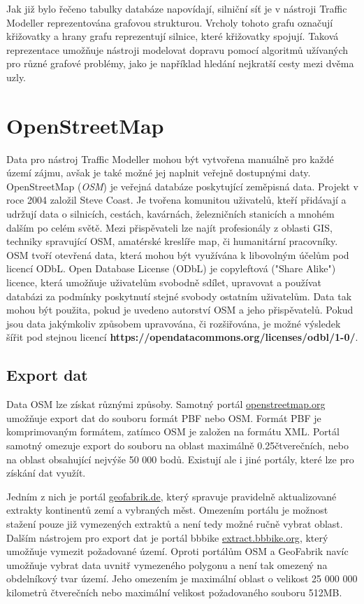 Jak již bylo řečeno tabulky databáze napovídají, silniční síť je v nástroji Traffic Modeller reprezentována grafovou strukturou. Vrcholy tohoto grafu označují křižovatky a hrany grafu reprezentují silnice, které křižovatky spojují. Taková reprezentace umožňuje nástroji modelovat dopravu pomocí algoritmů užívaných pro různé grafové problémy, jako je například hledání nejkratší cesty mezi dvěma uzly.



\section{OpenStreetMap}
\label{section:OpenStreetMap}

Data pro nástroj Traffic Modeller mohou být vytvořena manuálně pro každé území zájmu, avšak je také možné jej naplnit veřejně dostupnými daty. OpenStreetMap (\textit{OSM}) je veřejná databáze poskytující zeměpisná data. Projekt v roce 2004 založil Steve Coast. Je tvořena komunitou uživatelů, kteří přidávají a udržují data o silnicích, cestách, kavárnách, železničních stanicích a mnohém dalším po celém světě. Mezi přispěvateli lze najít profesionály z oblasti GIS, techniky spravující OSM, amatérské kreslíře map, či humanitární pracovníky. OSM tvoří otevřená data, která mohou být využívána k libovolným účelům pod licencí ODbL. Open Database License (ODbL) je copyleftová ("Share Alike") licence, která umožňuje uživatelům svobodně sdílet, upravovat a používat databázi za podmínky poskytnutí stejné svobody ostatním uživatelům. Data tak mohou být použita, pokud je uvedeno autorství OSM a jeho přispěvatelů. Pokud jsou data jakýmkoliv způsobem upravována, či rozšiřována, je možné výsledek šířit pod stejnou licencí \textbf{https://opendatacommons.org/licenses/odbl/1-0/}.

\subsection{Export dat}

Data OSM lze získat různými způsoby. Samotný portál \url{openstreetmap.org} umožňuje export dat do souboru formát PBF nebo OSM. Formát PBF je komprimovaným formátem, zatímco OSM je založen na formátu XML. Portál samotný omezuje export do souboru na oblast maximálně 0.25\degree čtverečních, nebo na oblast obsahující nejvýše 50 000 bodů. Existují ale i jiné portály, které lze pro získání dat využít.

Jedním z nich je portál \url{geofabrik.de}, který spravuje pravidelně aktualizované extrakty kontinentů zemí a vybraných měst. Omezením portálu je možnost stažení pouze již vymezených extraktů a není tedy možné ručně vybrat oblast. Dalším nástrojem pro export dat je portál bbbike \url{extract.bbbike.org}, který umožňuje vymezit požadované území. Oproti portálům OSM a GeoFabrik navíc umožňuje vybrat data uvnitř vymezeného polygonu a není tak omezený na obdelníkový tvar území.  Jeho omezením je maximální oblast o velikost 25 000 000 kilometrů čtverečních nebo maximální velikost požadovaného souboru 512MB.

